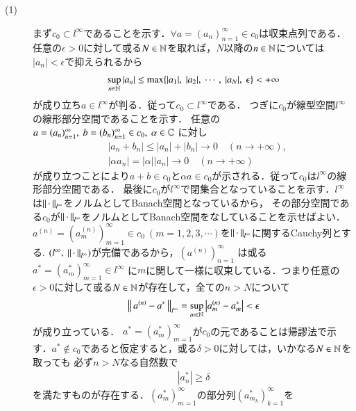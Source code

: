 \begin{prf}\mbox{}
\begin{description}
	\item[(1)] まず$c_0 \subset l^{\infty}$であることを示す．$\forall a=(a_n)_{n=1}^{\infty} \in c_0$は収束点列である．
		任意の$\epsilon > 0$に対して或る$N \in \mathbb{N}$を取れば，$N$以降の$n \in \mathbb{N}$については$|a_n| < \epsilon$で抑えられるから
		\begin{align}
			\sup{n \in \N}{|a_n|} \leq \max{}{\{|a_1|,\ |a_2|,\ \cdots,\ |a_N|,\ \epsilon\}} < +\infty
		\end{align}
		が成り立ち$a \in l^{\infty}$が判る．従って$c_0 \subset l^{\infty}$である．
		つぎに$c_0$が線型空間$l^{\infty}$の線形部分空間であることを示す．
		任意の$a=(a_n)_{n=1}^{\infty},\ b=(b_n)_{n=1}^{\infty} \in c_0,\ \alpha \in \C$
		に対し
		\begin{align}
			&|a_n + b_n| \leq |a_n| + |b_n| \longrightarrow 0 \quad (n \longrightarrow +\infty), \\
			&|\alpha a_n|= |\alpha||a_n| \longrightarrow 0 \quad (n \longrightarrow +\infty)
		\end{align}
		が成り立つことにより$a + b \in c_0$と$\alpha a \in c_0$が示される．従って$c_0$は$l^{\infty}$の線形部分空間である．
		最後に$c_0$が$l^{\infty}$で閉集合となっていることを示す．$l^{\infty}$は$\left\|\, \cdot\, \right\|_{l^{\infty}}$をノルムとしてBanach空間となっているから，
		その部分空間である$c_0$が$\left\|\, \cdot\, \right\|_{l^{\infty}}$をノルムとしてBanach空間をなしていることを示せばよい．
		$a^{(n)} = \left(a_m^{(n)}\right)_{m=1}^{\infty} \in c_0\ (m=1,2,3,\cdots)$を$\left\|\, \cdot\, \right\|_{l^{\infty}}$に関するCauchy列とする. 
		$(l^{\infty},\ \Norm{\cdot}{l^{\infty}})$が完備であるから，$\left(a^{(n)}\right)_{n=1}^{\infty}$
		は或る$a^{*} = \left(a_m^{*}\right)_{m=1}^{\infty} \in l^{\infty}$
		に$m$に関して一様に収束している．つまり任意の$\epsilon > 0$に対して或る$N \in \mathbb{N}$が存在して，全ての$n > N$について
		\begin{align}
			\left\|\, a^{(n)} - a^{*}\, \right\|_{l^{\infty}} = \operatorname*{sup}_{m \in \mathbb{N}} \left|a_m^{(n)} - a_m^{*}\right| < \epsilon \label{eq:func_analy_Q11}
		\end{align}
		が成り立っている．
		$a^{*} = (a_m^{*})_{m=1}^{\infty}$が$c_0$の元であることは帰謬法で示す．$a^* \notin c_0$であると仮定すると，或る$\delta > 0$に対しては，いかなる$N \in \mathbb{N}$を取っても
		必ず$n > N$なる自然数で
		\begin{align}
			|a_n^*| \geq \delta
		\end{align}
		を満たすものが存在する．$(a_m^*)_{m=1}^{\infty}$の部分列$(a_{m_k}^*)_{k=1}^{\infty}$を

\end{description}
\end{prf}
